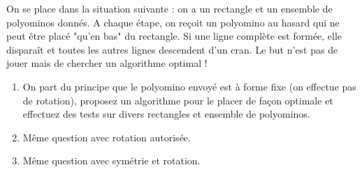 \documentclass{../ficheTDTP}
\begin{document}
On se place dans la situation suivante : on a un rectangle et un ensemble de polyominos donnés. A chaque étape, on reçoit un polyomino au hasard qui ne peut être placé "qu'en bas" du rectangle. Si une ligne complète est formée, elle disparaît et toutes les autres lignes descendent d'un cran. Le but n'est pas de jouer mais de chercher un algorithme optimal !


\begin{enumerate}
\item On part du principe que le polyomino envoyé est à forme fixe (on effectue pas de rotation), proposez un algorithme pour le placer de façon optimale et effectuez des tests sur divers rectangles et ensemble de polyominos.

\item Même question avec rotation autorisée.

\item Même question avec symétrie et rotation.

\end{enumerate}
\end{document}
